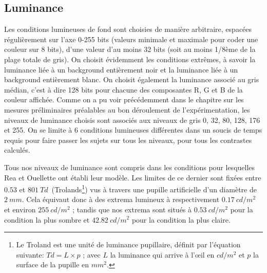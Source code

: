 	\subsection{Luminance}
	\par Les conditions lumineuses de fond sont choisies de manière arbitraire, espacées régulièrement sur l'axe 0-255 bits (valeurs minimale et maximale pour coder une couleur sur 8 bits), d'une valeur d'au moins 32 bits (soit au moins 1/8ème de la plage totale de gris). On choisit évidemment les conditions extrêmes, à savoir la luminance liée à un background entièrement noir et la luminance liée à un background entièrement blanc. On choisit également la luminance associé au gris médian, c'est à dire 128 bits pour chacune des composantes R, G et B de la couleur affichée. Comme on a pu voir précédemment dans le chapitre sur les mesures préliminaires préalables au bon déroulement de l'expérimentation, les niveaux de luminance choisis sont associés aux niveaux de gris 0, 32, 80, 128, 176 et 255. On se limite à 6 conditions lumineuses différentes dans un soucis de temps requis pour faire passer les sujets sur tous les niveaux, pour tous les contrastes calculés.

	\par Tous nos niveaux de luminance sont compris dans les conditions pour lesquelles Rea et Ouellette ont établi leur modèle. Les limites de ce dernier sont fixées entre $0.53$ et $801~Td$~(Trolands\footnote{Le Troland est une unité de luminance pupillaire, définit par l'équation suivante: $Td = L \times p$ ; avec $L$ la luminance qui arrive à l'œil en $cd/m^2$ et $p$ la surface de la pupille en $mm^2$.}) vus à travers une pupille artificielle d'un diamètre de $2~mm$. Cela équivaut donc à des extrema lumineux à respectivement $0.17~cd/m^2$ et environ $255~cd/m^2$ ; tandis que nos extrema sont situés à $0.53~cd/m^2$ pour la condition la plus sombre et $42.82~cd/m^2$ pour la condition la plus claire.
	
